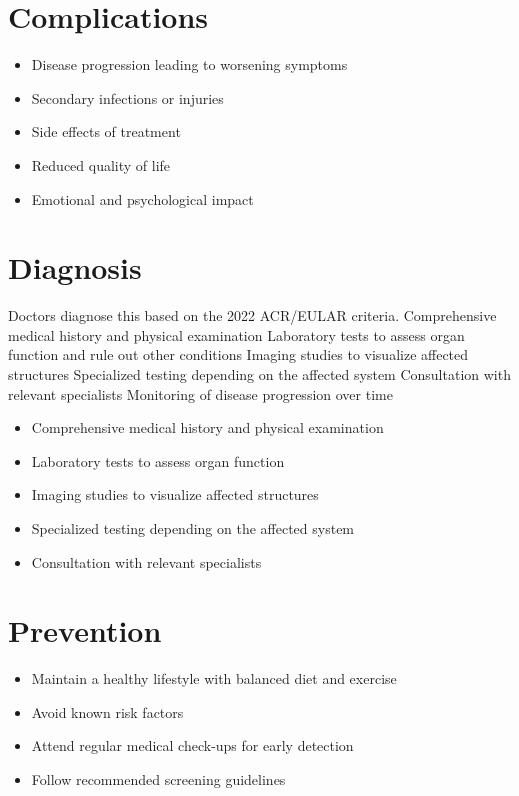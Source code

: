 \section{Complications}
\begin{itemize}[noitemsep]
  \item Disease progression leading to worsening symptoms
  \item Secondary infections or injuries
  \item Side effects of treatment
  \item Reduced quality of life
  \item Emotional and psychological impact
\end{itemize}
\section{Diagnosis}
Doctors diagnose this based on the 2022 ACR/EULAR criteria. Comprehensive medical history and physical examination Laboratory tests to assess organ function and rule out other conditions Imaging studies to visualize affected structures Specialized testing depending on the affected system Consultation with relevant specialists Monitoring of disease progression over time

\begin{itemize}[noitemsep]
  \item Comprehensive medical history and physical examination
  \item Laboratory tests to assess organ function
  \item Imaging studies to visualize affected structures
  \item Specialized testing depending on the affected system
  \item Consultation with relevant specialists
\end{itemize}
\section{Prevention}
\begin{itemize}[noitemsep]
  \item Maintain a healthy lifestyle with balanced diet and exercise
  \item Avoid known risk factors
  \item Attend regular medical check-ups for early detection
  \item Follow recommended screening guidelines
\end{itemize}
